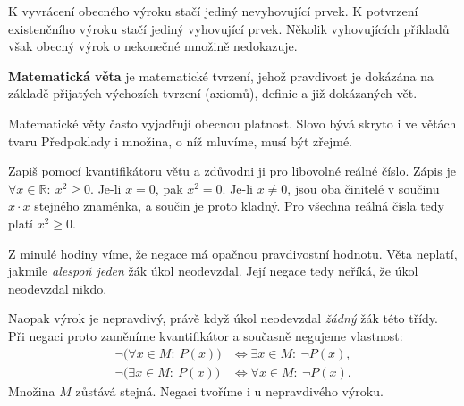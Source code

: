 \documentclass[11pt,a4paper]{article}
\begin{document}
K vyvrácení obecného výroku stačí jediný nevyhovující prvek.
K potvrzení existenčního výroku stačí jediný vyhovující prvek.
Několik vyhovujících příkladů však obecný výrok o nekonečné množině
nedokazuje.


\newpage
{}
\begin{definiceBox}[title={Definice - Matematická věta}]
\textbf{Matematická věta} je matematické tvrzení, jehož pravdivost
je dokázána na základě přijatých výchozích tvrzení (axiomů), definic
a již dokázaných vět.
\end{definiceBox}

Matematické věty často vyjadřují obecnou platnost. Slovo 
bývá skryto i ve větách tvaru 
Předpoklady i množina, o níž mluvíme, musí být zřejmé.

\begin{prikladReseniBox}[title={Příklad 2}]
Zapiš pomocí kvantifikátoru větu  a zdůvodni ji pro libovolné reálné číslo.
\tcblower
Zápis je $\forall x\in\mathbb{R}:\ x^2\geq0$.
Je-li $x=0$, pak $x^2=0$. Je-li $x\ne0$, jsou oba činitelé
v součinu $x\cdot x$ stejného znaménka, a součin je proto kladný.
Pro všechna reálná čísla tedy platí $x^2\geq0$.
\end{prikladReseniBox}


Z minulé hodiny víme, že negace má opačnou pravdivostní hodnotu.
Věta  neplatí, jakmile
\emph{alespoň jeden} žák úkol neodevzdal. Její negace tedy neříká,
že úkol neodevzdal nikdo.

Naopak výrok 
je nepravdivý, právě když úkol neodevzdal \emph{žádný} žák této třídy.
Při negaci proto zaměníme kvantifikátor a současně negujeme vlastnost:
\begin{align*}
 \neg\bigl(\forall x\in M:\ P(x)\bigr)
   &\Leftrightarrow \exists x\in M:\ \neg P(x),\\
 \neg\bigl(\exists x\in M:\ P(x)\bigr)
   &\Leftrightarrow \forall x\in M:\ \neg P(x).
\end{align*}
Množina $M$ zůstává stejná. Negaci tvoříme i u nepravdivého výroku.
\end{document}
